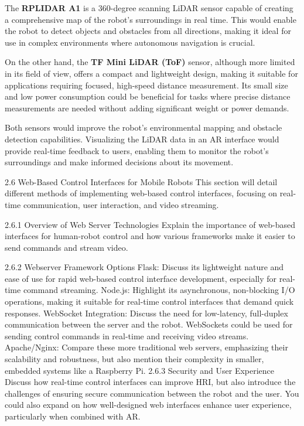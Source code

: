 The \textbf{RPLIDAR A1} is a 360-degree scanning LiDAR sensor capable of creating a comprehensive map of the robot's surroundings in real time. This would enable the robot to detect objects and obstacles from all directions, making it ideal for use in complex environments where autonomous navigation is crucial.

On the other hand, the \textbf{TF Mini LiDAR (ToF)} sensor, although more limited in its field of view, offers a compact and lightweight design, making it suitable for applications requiring focused, high-speed distance measurement. Its small size and low power consumption could be beneficial for tasks where precise distance measurements are needed without adding significant weight or power demands.

Both sensors would improve the robot's environmental mapping and obstacle detection capabilities. Visualizing the LiDAR data in an AR interface would provide real-time feedback to users, enabling them to monitor the robot’s surroundings and make informed decisions about its movement.


2.6 Web-Based Control Interfaces for Mobile Robots
This section will detail different methods of implementing web-based control interfaces, focusing on real-time communication, user interaction, and video streaming.

2.6.1 Overview of Web Server Technologies
Explain the importance of web-based interfaces for human-robot control and how various frameworks make it easier to send commands and stream video.

2.6.2 Webserver Framework Options
Flask: Discuss its lightweight nature and ease of use for rapid web-based control interface development, especially for real-time command streaming.
Node.js: Highlight its asynchronous, non-blocking I/O operations, making it suitable for real-time control interfaces that demand quick responses.
WebSocket Integration: Discuss the need for low-latency, full-duplex communication between the server and the robot. WebSockets could be used for sending control commands in real-time and receiving video streams.
Apache/Nginx: Compare these more traditional web servers, emphasizing their scalability and robustness, but also mention their complexity in smaller, embedded systems like a Raspberry Pi.
2.6.3 Security and User Experience
Discuss how real-time control interfaces can improve HRI, but also introduce the challenges of ensuring secure communication between the robot and the user. You could also expand on how well-designed web interfaces enhance user experience, particularly when combined with AR.

